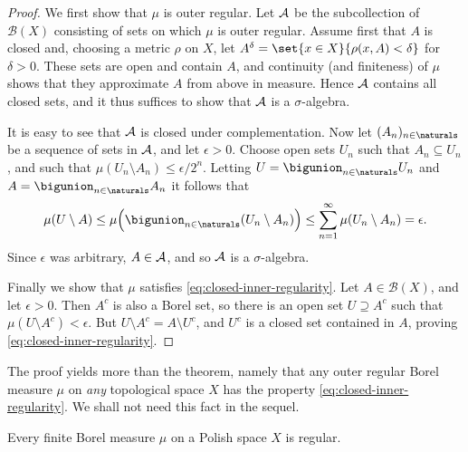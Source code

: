 \documentclass[article, a4paper, 11pt, oneside]{memoir}
\numberwithin{equation}{chapter}
\newcommand{\calB}{\mathcal{B}}
\newcommand{\borel}[1]{\calB(#1)}
\begin{document}
\begin{proof}
    We first show that $\mu$ is outer regular. Let $\mathcal{A}$ be the subcollection of $\borel{X}$ consisting of sets on which $\mu$ is outer regular. Assume first that $A$ is closed and, choosing a metric $\rho$ on $X$, let $A^\delta = \set{x \in X}{\rho(x,A) < \delta}$ for $\delta > 0$. These sets are open and contain $A$, and continuity (and finiteness) of $\mu$ shows that they approximate $A$ from above in measure. Hence $\mathcal{A}$ contains all closed sets, and it thus suffices to show that $\mathcal{A}$ is a $\sigma$-algebra.

    It is easy to see that $\mathcal{A}$ is closed under complementation. Now let $(A_n)_{n \in \naturals}$ be a sequence of sets in $\mathcal{A}$, and let $\epsilon > 0$. Choose open sets $U_n$ such that $A_n \subseteq U_n$, and such that $\mu(U_n \setminus A_n) \leq \epsilon/2^n$. Letting $U = \bigunion_{n \in \naturals} U_n$ and $A = \bigunion_{n \in \naturals} A_n$ it follows that
    \begin{equation*}
        \mu(U \setminus A)
            \leq \mu \Bigl( \bigunion_{n \in \naturals} (U_n \setminus A_n) \Bigr)
            \leq \sum_{n=1}^\infty \mu(U_n \setminus A_n)
            = \epsilon.
    \end{equation*}
    Since $\epsilon$ was arbitrary, $A \in \mathcal{A}$, and so $\mathcal{A}$ is a $\sigma$-algebra.

    Finally we show that $\mu$ satisfies \eqref{eq:closed-inner-regularity}. Let $A \in \borel{X}$, and let $\epsilon > 0$. Then $A^c$ is also a Borel set, so there is an open set $U \supseteq A^c$ such that $\mu(U \setminus A^c) < \epsilon$. But $U \setminus A^c = A \setminus U^c$, and $U^c$ is a closed set contained in $A$, proving \eqref{eq:closed-inner-regularity}.
\end{proof}
%
The proof yields more than the theorem, namely that any outer regular Borel measure $\mu$ on \emph{any} topological space $X$ has the property \eqref{eq:closed-inner-regularity}. We shall not need this fact in the sequel.


\begin{lemma}
    \label{thm:Polish-regular}
    Every finite Borel measure $\mu$ on a Polish space $X$ is regular.
\end{lemma}
\end{document}
